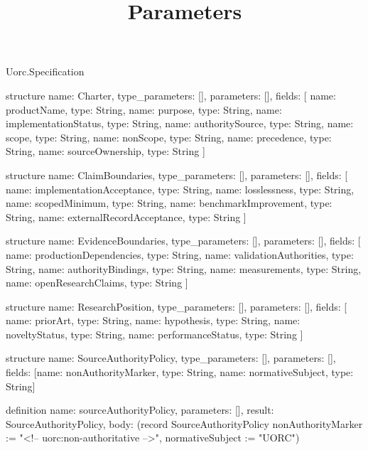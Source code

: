 \begin{lexlean}{Uorc.Specification}
\title{Parameters}
\begin{semanticmodule}
structure{
  name: Charter,
  type_parameters: [],
  parameters: [],
  fields: [
    {name: productName, type: String},
    {name: purpose, type: String},
    {name: implementationStatus, type: String},
    {name: authoritySource, type: String},
    {name: scope, type: String},
    {name: nonScope, type: String},
    {name: precedence, type: String},
    {name: sourceOwnership, type: String}
  ]
}

structure{
  name: ClaimBoundaries,
  type_parameters: [],
  parameters: [],
  fields: [
    {name: implementationAcceptance, type: String},
    {name: losslessness, type: String},
    {name: scopedMinimum, type: String},
    {name: benchmarkImprovement, type: String},
    {name: externalRecordAcceptance, type: String}
  ]
}

structure{
  name: EvidenceBoundaries,
  type_parameters: [],
  parameters: [],
  fields: [
    {name: productionDependencies, type: String},
    {name: validationAuthorities, type: String},
    {name: authorityBindings, type: String},
    {name: measurements, type: String},
    {name: openResearchClaims, type: String}
  ]
}

structure{
  name: ResearchPosition,
  type_parameters: [],
  parameters: [],
  fields: [
    {name: priorArt, type: String},
    {name: hypothesis, type: String},
    {name: noveltyStatus, type: String},
    {name: performanceStatus, type: String}
  ]
}

structure{
  name: SourceAuthorityPolicy,
  type_parameters: [],
  parameters: [],
  fields: [{name: nonAuthorityMarker, type: String}, {name: normativeSubject, type: String}]
}

definition{
  name: sourceAuthorityPolicy,
  parameters: [],
  result: SourceAuthorityPolicy,
  body: (record SourceAuthorityPolicy {nonAuthorityMarker := "<!-- uorc:non-authoritative -->", normativeSubject := "UORC"})
}


\end{semanticmodule}
\end{lexlean}
